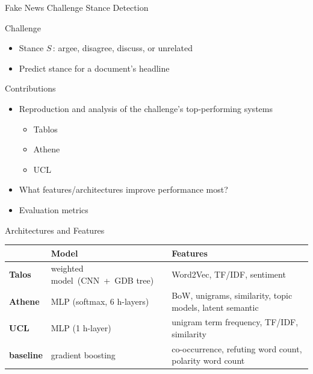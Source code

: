 \documentclass[english,handout]{mlutalk}
\newcommand{\TFIDF}{\mbox{TF/IDF}\xspace}
\begin{document}
\begin{frame}[allowframebreaks]{Fake News Challenge Stance Detection~\cite{HanselowskiSSCC2018}}

  \begin{block}{Challenge}
    \begin{itemize}
      \item Stance $S$\,: argee, disagree, discuss, or unrelated
      \item Predict stance for a document's headline
    \end{itemize}
  \end{block}

  \begin{block}{Contributions}
    \begin{itemize}
      \item Reproduction and analysis of the challenge's top-performing systems
      \begin{itemize}
        \item Tablos
        \item Athene
        \item UCL
      \end{itemize}
      \item What features/architectures improve performance most?
      \item Evaluation metrics
    \end{itemize}
  \end{block}
  
  \framebreak

  \begin{block}{Architectures and Features}
    \footnotesize\centering\vspace*{1ex}
    \begin{tabularx}{\linewidth}{llX}
      \toprule
      & \textbf{Model} & \textbf{Features} \\
      \midrule
      \textbf{Talos} & weighted model~(CNN~+~GDB tree) & Word2Vec, \TFIDF, sentiment \\
      \textbf{Athene} & MLP (softmax, 6 h-layers) & BoW, unigrams, similarity, topic models, latent semantic \\
      \textbf{UCL} & MLP (1 h-layer) & unigram term frequency, \TFIDF, similarity \\
      \textbf{baseline} & gradient boosting & co-occurrence, refuting word count, polarity word count \\
      \bottomrule
    \end{tabularx}
  \end{block}
    

\end{frame}
\end{document}
